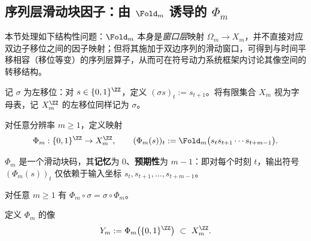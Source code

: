 \subsection{序列层滑动块因子：由 \texorpdfstring{$\Fold_m$}{Fold\_m} 诱导的 \texorpdfstring{$\Phi_m$}{Phi\_m}}\label{subsec:Phi_m-sliding-block-factor}

本节处理如下结构性问题：$\Fold_m$ 本身是\emph{窗口层}映射 $\Omega_m\to X_m$，并不直接对应双边子移位之间的因子映射；但将其施加于双边序列的滑动窗口，可得到与时间平移相容（移位等变）的序列层算子，从而可在符号动力系统框架内讨论其像空间的转移结构。

记 $\sigma$ 为左移位：对 $s\in\{0,1\}^{\ZZ}$，定义 $(\sigma s)_t:=s_{t+1}$。将有限集合 $X_m$ 视为字母表，记 $X_m^{\ZZ}$ 的左移位同样记为 $\sigma$。

\begin{definition}\label{def:Phi_m}
对任意分辨率 $m\ge 1$，定义映射
\[
\Phi_m:\{0,1\}^{\ZZ}\to X_m^{\ZZ},\qquad
(\Phi_m(s))_t:=\Fold_m\bigl(s_t s_{t+1}\cdots s_{t+m-1}\bigr).
\]
\end{definition}

\begin{proposition}\label{prop:Phi_m-radius}
$\Phi_m$ 是一个滑动块码，其\textbf{记忆}为 $0$、\textbf{预期性}为 $m-1$：即对每个时刻 $t$，输出符号 $(\Phi_m(s))_t$ 仅依赖于输入坐标
\(
s_t,s_{t+1},\dots,s_{t+m-1}
\)。
\end{proposition}

\begin{proposition}\label{prop:Phi_m-equivariant}
对任意 $m\ge 1$ 有 $\Phi_m\circ\sigma=\sigma\circ\Phi_m$。
\end{proposition}

\begin{definition}[像空间]\label{def:Y_m}
定义 $\Phi_m$ 的像
\[
Y_m:=\Phi_m\bigl(\{0,1\}^{\ZZ}\bigr)\ \subset\ X_m^{\ZZ}.
\]
\end{definition}

